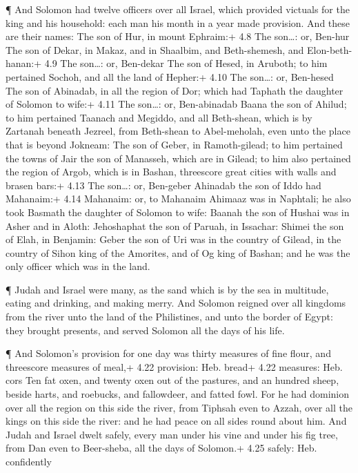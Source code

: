  ¶ And Solomon had twelve officers over all Israel, which
provided victuals for the king and his household: each man his month in
a year made provision.  And these are their names: The son
of Hur, in mount Ephraim:+ 4.8 The son\ldots: or, Ben-hur 
The son of Dekar, in Makaz, and in Shaalbim, and Beth-shemesh, and
Elon-beth-hanan:+ 4.9 The son\ldots: or, Ben-dekar  The son
of Hesed, in Aruboth; to him pertained Sochoh, and all the land of
Hepher:+ 4.10 The son\ldots: or, Ben-hesed  The son of
Abinadab, in all the region of Dor; which had Taphath the daughter of
Solomon to wife:+ 4.11 The son\ldots: or, Ben-abinadab 
Baana the son of Ahilud; to him pertained Taanach and Megiddo, and all
Beth-shean, which is by Zartanah beneath Jezreel, from Beth-shean to
Abel-meholah, even unto the place that is beyond Jokneam: 
The son of Geber, in Ramoth-gilead; to him pertained the towns of Jair
the son of Manasseh, which are in Gilead; to him also pertained the
region of Argob, which is in Bashan, threescore great cities with walls
and brasen bars:+ 4.13 The son\ldots: or, Ben-geber 
Ahinadab the son of Iddo had Mahanaim:+ 4.14 Mahanaim: or, to Mahanaim
 Ahimaaz was in Naphtali; he also took Basmath the daughter
of Solomon to wife:  Baanah the son of Hushai was in Asher
and in Aloth:  Jehoshaphat the son of Paruah, in Issachar:
 Shimei the son of Elah, in Benjamin:  Geber
the son of Uri was in the country of Gilead, in the country of Sihon
king of the Amorites, and of Og king of Bashan; and he was the only
officer which was in the land.

 ¶ Judah and Israel were many, as the sand which is by the
sea in multitude, eating and drinking, and making merry. 
And Solomon reigned over all kingdoms from the river unto the land of
the Philistines, and unto the border of Egypt: they brought presents,
and served Solomon all the days of his life.

 ¶ And Solomon's provision for one day was thirty measures
of fine flour, and threescore measures of meal,+ 4.22 provision: Heb.
bread+ 4.22 measures: Heb. cors  Ten fat oxen, and twenty
oxen out of the pastures, and an hundred sheep, beside harts, and
roebucks, and fallowdeer, and fatted fowl.  For he had
dominion over all the region on this side the river, from Tiphsah even
to Azzah, over all the kings on this side the river: and he had peace on
all sides round about him.  And Judah and Israel dwelt
safely, every man under his vine and under his fig tree, from Dan even
to Beer-sheba, all the days of Solomon.+ 4.25 safely: Heb. confidently

